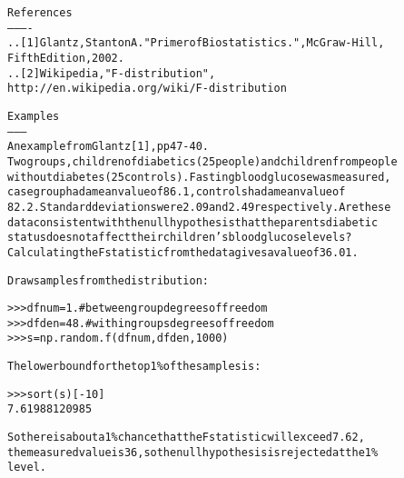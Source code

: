\begin{boxedminipage}{\funcwidth}
\begin{alltt}
References
----------
.. [1] Glantz, Stanton A. "Primer of Biostatistics.", McGraw-Hill,
       Fifth Edition, 2002.
.. [2] Wikipedia, "F-distribution",
       http://en.wikipedia.org/wiki/F-distribution

Examples
--------
An example from Glantz[1], pp 47-40.
Two groups, children of diabetics (25 people) and children from people
without diabetes (25 controls). Fasting blood glucose was measured,
case group had a mean value of 86.1, controls had a mean value of
82.2. Standard deviations were 2.09 and 2.49 respectively. Are these
data consistent with the null hypothesis that the parents diabetic
status does not affect their children's blood glucose levels?
Calculating the F statistic from the data gives a value of 36.01.

Draw samples from the distribution:

{\textgreater}{\textgreater}{\textgreater} dfnum = 1. \# between group degrees of freedom
{\textgreater}{\textgreater}{\textgreater} dfden = 48. \# within groups degrees of freedom
{\textgreater}{\textgreater}{\textgreater} s = np.random.f(dfnum, dfden, 1000)

The lower bound for the top 1\% of the samples is :

{\textgreater}{\textgreater}{\textgreater} sort(s)[-10]
7.61988120985

So there is about a 1\% chance that the F statistic will exceed 7.62,
the measured value is 36, so the null hypothesis is rejected at the 1\%
level.
\end{alltt}

\setlength{\parskip}{1ex}
    \end{boxedminipage}

    \label{QSTK:qstklearn:mldiagnostics:gamma}

    \vspace{0.5ex}

